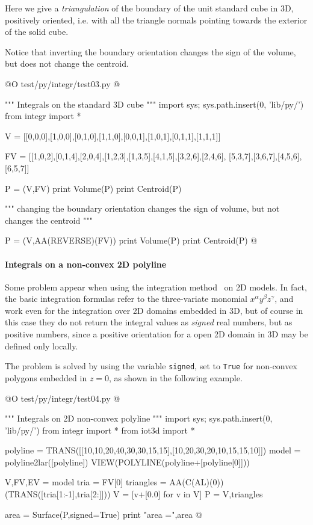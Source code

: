 \documentclass[11pt,oneside]{article}	%
\begin{document}
Here we give a \emph{triangulation} of the boundary of the unit standard cube in 3D,
positively oriented, i.e. with all the triangle normals pointing towards the
exterior of the solid cube.

Notice that inverting the boundary orientation changes the sign of the volume, 
but does not change the centroid.

@O test/py/integr/test03.py
@{""" Integrals on the standard 3D cube """
import sys; sys.path.insert(0, 'lib/py/')
from integr import *

V = [[0,0,0],[1,0,0],[0,1,0],[1,1,0],[0,0,1],[1,0,1],[0,1,1],[1,1,1]]

FV = [[1,0,2],[0,1,4],[2,0,4],[1,2,3],[1,3,5],[4,1,5],[3,2,6],[2,4,6],
	  [5,3,7],[3,6,7],[4,5,6],[6,5,7]]

P = (V,FV)
print Volume(P)
print Centroid(P)

""" changing the boundary orientation changes the sign of volume,
	 but not changes the centroid """

P = (V,AA(REVERSE)(FV))
print Volume(P)
print Centroid(P)
@}


\paragraph{Integrals on a non-convex 2D polyline}

Some problem appear when using the integration method~\cite{CattaniP-BIL1990} on 2D models.
In fact, the basic integration formulas refer to the three-variate monomial $x^\alpha y^\beta z^\gamma$, 
and work even for the integration over 2D domains embedded in 3D, but of course in this case they do not return
the integral values as \emph{signed} real numbers, but as positive numbers, since a positive orientation for a open 2D domain in 3D may be defined only locally.

The problem is solved by using the variable \texttt{signed}, set to \texttt{True} for non-convex polygons embedded in $z=0$,
as shown in the following example.

@O test/py/integr/test04.py
@{""" Integrals on 2D non-convex polyline """
import sys; sys.path.insert(0, 'lib/py/')
from integr import *
from iot3d import *

polyline = TRANS([[10,10,20,40,30,30,15,15],[10,20,30,20,10,15,15,10]])
model = polyline2lar([polyline])
VIEW(POLYLINE(polyline+[polyline[0]]))

V,FV,EV = model
tria = FV[0]
triangles = AA(C(AL)(0))(TRANS([tria[1:-1],tria[2:]]))
V = [v+[0.0] for v in V]
P = V,triangles

area = Surface(P,signed=True)
print "area =",area
@}
\end{document}

